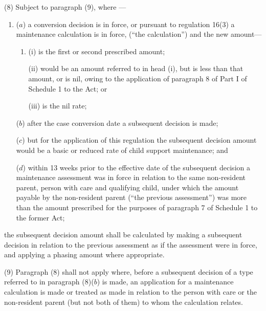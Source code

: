 \documentclass[12pt,a4paper]{article}
\begin{document}
(8) 
Subject to paragraph (9), where%
—
\begin{enumerate}\item[]

($a$) a 
conversion decision  %
is in force, or pursuant to regulation 16(3) a maintenance calculation is in force, (“the calculation”) and the new amount—
\begin{enumerate}\item[]
(i) is the first or second prescribed amount;

(ii) would be an amount referred to in head (i), but is less than that amount, or is nil, owing to the application of paragraph 8 of Part I of Schedule 1 to the Act; or

(iii) is the nil rate;
\end{enumerate}

($b$) after the case conversion date a subsequent decision is made;

($c$) but for the application of this regulation the subsequent decision amount would be a basic or reduced rate of child support maintenance; and

($d$) within 13 weeks prior to the effective date of the subsequent decision a maintenance assessment was in force in relation to the same non-resident parent, person with care and qualifying child, under which the amount payable by the non-resident parent (“the previous assessment”) was more than the amount prescribed for the purposes of paragraph 7 of Schedule 1 to the former Act;
\end{enumerate}
the subsequent decision amount shall be calculated by making a subsequent decision in relation to the previous assessment as if the assessment were in force, and applying a phasing amount where appropriate.

(9) Paragraph (8) shall not apply where, before a subsequent decision of a type referred to in paragraph (8)($b$)  is made, an application for a maintenance calculation is made or treated as made in relation to the person with care or the non-resident parent (but not both of them) to whom the calculation relates.
\end{document}
